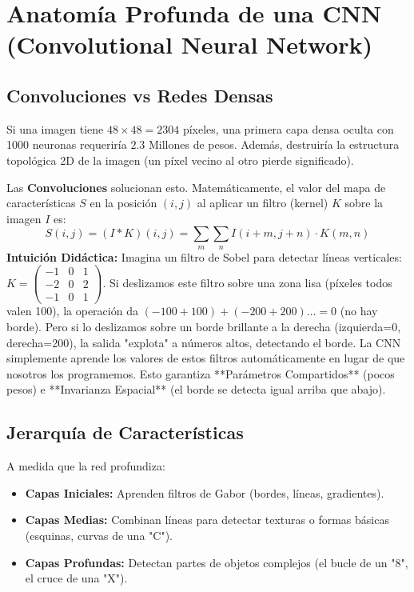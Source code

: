 \documentclass[11pt,a4paper]{article}
\begin{document}
\section{Anatom\'ia Profunda de una CNN (Convolutional Neural Network)}

\subsection{Convoluciones vs Redes Densas}
Si una imagen tiene $48 \times 48 = 2304$ p\'ixeles, una primera capa densa oculta con 1000 neuronas requerir\'ia $2.3$ Millones de pesos. Adem\'as, destruir\'ia la estructura topol\'ogica 2D de la imagen (un p\'ixel vecino al otro pierde significado).

Las \textbf{Convoluciones} solucionan esto. Matem\'aticamente, el valor del mapa de caracter\'isticas $S$ en la posici\'on $(i,j)$ al aplicar un filtro (kernel) $K$ sobre la imagen $I$ es:
\begin{equation}
S(i,j) = (I * K)(i,j) = \sum_{m} \sum_{n} I(i+m, j+n) \cdot K(m,n)
\end{equation}
\textbf{Intuici\'on Did\'actica:} Imagina un filtro de Sobel para detectar l\'ineas verticales: $K = \begin{pmatrix} -1 & 0 & 1 \\ -2 & 0 & 2 \\ -1 & 0 & 1 \end{pmatrix}$. 
Si deslizamos este filtro sobre una zona lisa (p\'ixeles todos valen 100), la operaci\'on da $(-100 + 100) + (-200 + 200) \dots = 0$ (no hay borde). Pero si lo deslizamos sobre un borde brillante a la derecha (izquierda=0, derecha=200), la salida "explota" a n\'umeros altos, detectando el borde.
La CNN simplemente aprende los valores de estos filtros autom\'aticamente en lugar de que nosotros los programemos. Esto garantiza **Par\'ametros Compartidos** (pocos pesos) e **Invarianza Espacial** (el borde se detecta igual arriba que abajo).

\subsection{Jerarqu\'ia de Caracter\'isticas}
A medida que la red profundiza:
\begin{itemize}
    \item \textbf{Capas Iniciales:} Aprenden filtros de Gabor (bordes, l\'ineas, gradientes).
    \item \textbf{Capas Medias:} Combinan l\'ineas para detectar texturas o formas b\'asicas (esquinas, curvas de una "C").
    \item \textbf{Capas Profundas:} Detectan partes de objetos complejos (el bucle de un "8", el cruce de una "X").
\end{itemize}
\end{document}

